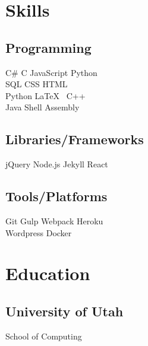 \documentclass[]{plushcv}
\begin{document}
    \begin{minipage}[t]{0.25\textwidth}


        \section{Skills}
        \subsection{Programming}
        \sectionsep
        C\# \textbullet{} C \textbullet{} JavaScript \textbullet{} Python    \\ SQL \textbullet{} CSS \textbullet{} HTML \textbullet{} \\
        \sectionsep
        Python \textbullet{} \LaTeX\ \textbullet{}  C++  \\
        \sectionsep
        Java \textbullet{}  Shell \textbullet{} Assembly \\
        \sectionsep
        \sectionsep
        \subsection{Libraries/Frameworks}
        \sectionsep
        jQuery \textbullet{} Node.js \textbullet{} Jekyll \textbullet{} React \\
        \sectionsep
        \sectionsep
        \subsection{Tools/Platforms}
        \sectionsep
        Git \textbullet{} Gulp \textbullet{} Webpack \textbullet{} Heroku    \\ Wordpress \textbullet{} Docker \\

        \sectionsep


        \section{Education}
        \subsection{University of Utah}
        School of Computing \\


\end{minipage}
\end{document}

